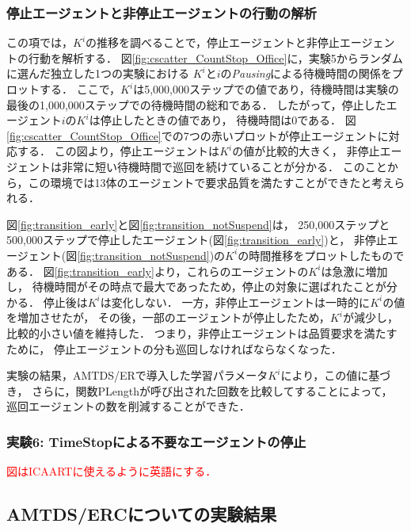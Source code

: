 \documentclass[12pt,a4j,twoside]{jarticle}
\def\red#1{\textcolor{red}{#1}}
\begin{document}
  \subsubsection{停止エージェントと非停止エージェントの行動の解析}
  この項では，$K^i$の推移を調べることで，停止エージェントと非停止エージェントの行動を解析する．
  図\ref{fig:cscatter_CountStop_Office}に，実験5からランダムに選んだ独立した1つの実験における
  $K^i$と$i$の{\em Pausing}による待機時間の関係をプロットする．
  ここで，$K^i$は5,000,000ステップでの値であり，待機時間は実験の最後の1,000,000ステップでの待機時間の総和である．
  したがって，停止したエージェント$i$の$K^i$は停止したときの値であり，
  待機時間は0である．
  図\ref{fig:cscatter_CountStop_Office}での7つの赤いプロットが停止エージェントに対応する．
  この図より，停止エージェントは$K^i$の値が比較的大きく，
  非停止エージェントは非常に短い待機時間で巡回を続けていることが分かる．
  このことから，この環境では13体のエージェントで要求品質を満たすことができたと考えられる．
  \par

  図\ref{fig:transition_early}と図\ref{fig:transition_notSuspend}は，
  250,000ステップと500,000ステップで停止したエージェント(図\ref{fig:transition_early})と，
  非停止エージェント(図\ref{fig:transition_notSuspend})の$K^i$の時間推移をプロットしたものである．
  図\ref{fig:transition_early}より，これらのエージェントの$K^i$は急激に増加し，
  待機時間がその時点で最大であったため，停止の対象に選ばれたことが分かる．
  停止後は$K^i$は変化しない．
  一方，非停止エージェントは一時的に$K^i$の値を増加させたが，
  その後，一部のエージェントが停止したため，$K^i$が減少し，
  比較的小さい値を維持した．
  つまり，非停止エージェントは品質要求を満たすために，
  停止エージェントの分も巡回しなければならなくなった．
  \par

  実験の結果，AMTDS/ERで導入した学習パラメータ$K^i$により，この値に基づき，
  さらに，関数\textsf{PLength}が呼び出された回数を比較してすることによって，
  巡回エージェントの数を削減することができた．

  

  \subsubsection{実験6: TimeStopによる不要なエージェントの停止}\label{ex:ER6}
  \red{図はICAARTに使えるように英語にする．}\\


  \subsection{AMTDS/ERCについての実験結果}\label{result_ERC}
  
\end{document}
